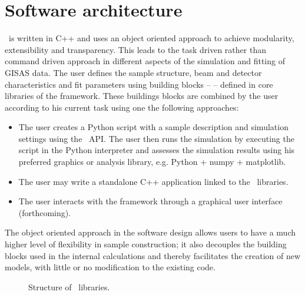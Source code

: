 \newpage
\chapter{Software architecture}
 

\BornAgain\ is written in C++
and uses an object oriented approach to 
achieve modularity, extensibility and transparency.
This leads to the task driven rather than command driven approach in 
different aspects of the simulation and fitting of GISAS data.
The user defines the sample structure, beam and detector characteristics and
fit parameters using building
blocks --  -- defined in core libraries of the framework.
These buildings blocks are combined by the user according to his current
task using one the following approaches:
\begin{itemize}
\item The user creates a Python script with a sample description and simulation settings
using the \BornAgain\ API.
The user then runs the simulation by executing the script in the Python interpreter and assesses the
simulation results using his preferred graphics or analysis library, e.g. Python + numpy + matplotlib.
\item The user may write a standalone C++ application linked to the \BornAgain\ libraries.
\item The user interacts with the framework through a graphical 
user interface (forthcoming).
\end{itemize}

The object oriented approach in the software design allows users 
to have a much higher level of flexibility in sample construction; it also
decouples the building blocks used in the internal calculations and thereby facilitates the creation of new models,
with little or no modification to the existing code. 


\begin{figure}[htbp]
\centering
\caption{
Structure of \BornAgain\ libraries.
}
\label{fig:two_ratios}
\end{figure}


